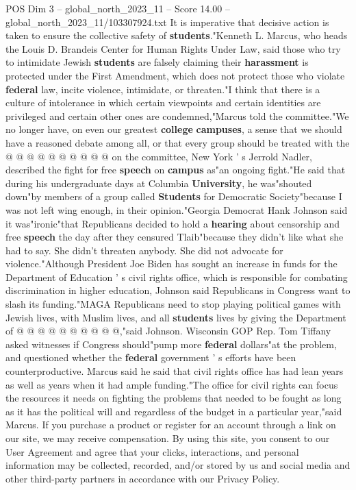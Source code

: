 \begin{textsample}{POS Dim 3 – global\_north\_2023\_11 – Score 14.00 – global\_north\_2023\_11/103307924.txt}
It is imperative that decisive action is taken to ensure the collective safety of \textbf{students}."Kenneth L.
Marcus, who heads the Louis D.
Brandeis Center for Human Rights Under Law, said those who try to intimidate Jewish \textbf{students} are falsely claiming their \textbf{harassment} is protected under the First Amendment, which does not protect those who violate \textbf{federal} law, incite violence, intimidate, or threaten."I think that there is a culture of intolerance in which certain viewpoints and certain identities are privileged and certain other ones are condemned,"Marcus told the committee."We no longer have, on even our greatest \textbf{college} \textbf{campuses}, a sense that we should have a reasoned debate among all, or that every group should be treated with the @ @ @ @ @ @ @ @ @ @ on the committee, New York ' s Jerrold Nadler, described the fight for free \textbf{speech} on \textbf{campus} as"an ongoing fight."He said that during his undergraduate days at Columbia \textbf{University}, he was"shouted down"by members of a group called \textbf{Students} for Democratic Society"because I was not left wing enough, in their opinion."Georgia Democrat Hank Johnson said it was"ironic"that Republicans decided to hold a \textbf{hearing} about censorship and free \textbf{speech} the day after they censured Tlaib"because they didn't like what she had to say.
She didn't threaten anybody.
She did not advocate for violence."Although President Joe Biden has sought an increase in funds for the Department of Education ' s civil rights office, which is responsible for combating discrimination in higher education, Johnson said Republicans in Congress want to slash its funding."MAGA Republicans need to stop playing political games with Jewish lives, with Muslim lives, and all \textbf{students} lives by giving the Department of @ @ @ @ @ @ @ @ @ @,"said Johnson.
Wisconsin GOP Rep.
Tom Tiffany asked witnesses if Congress should"pump more \textbf{federal} dollars"at the problem, and questioned whether the \textbf{federal} government ' s efforts have been counterproductive.
Marcus said he said that civil rights office has had lean years as well as years when it had ample funding."The office for civil rights can focus the resources it needs on fighting the problems that needed to be fought as long as it has the political will and regardless of the budget in a particular year,"said Marcus.
If you purchase a product or register for an account through a link on our site, we may receive compensation.
By using this site, you consent to our User Agreement and agree that your clicks, interactions, and personal information may be collected, recorded, and/or stored by us and social media and other third-party partners in accordance with our Privacy Policy.

\end{textsample}
